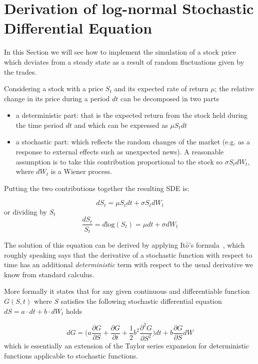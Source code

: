 \section{Derivation of log-normal Stochastic Differential Equation}
\label{derivation-of-log-normal-stochastic-differential-equation}

In this Section we will see how to implement the simulation of a stock price which deviates from a steady state as a result of random fluctuations given by the trades. 

Considering a stock with a price \(S_t\) and its expected rate of return \(\mu\); the relative change in its price during a period \(dt\) can be decomposed in two parts

\begin{itemize}
	\tightlist
	\item
	a deterministic part: that is the expected return from the stock held
	during the time period \(dt\) and which can be expressed as \(\mu S_tdt\)
	\item
	a stochastic part: which reflects the random changes of the market
	(e.g. as a response to external effects such as unexpected news). A
	reasonable assumption is to take this contribution proportional to the
	stock so \(\sigma S_t dW_t\), where \(dW_t\) is a Wiener process.
\end{itemize}
Putting the two contributions together the resulting SDE is:

\begin{equation}
dS_t = \mu S_t dt + \sigma S_t dW_t
\label{eq:differential}
\end{equation}
or dividing by $S_t$
\begin{equation}
\frac{dS_t}{S_t} = d\textrm{log}(S_t) = \mu dt + \sigma dW_t
\label{eq:differential_relative}
\end{equation}

The solution of this equation can be derived by applying It\(\hat{o}\)'s formula~\cite{bib:ito_lemma}, which roughly speaking says that the derivative of a stochastic function with respect to time has an additional \emph{deterministic} term with respect to the usual derivative we know from standard calculus. 

More formally it states that for any given continuous and differentiable function \(G(S, t)\) where \(S\) satisfies the following stochastic differential equation \(dS=a\cdot dt +b\cdot dW_t\) holds

\begin{equation}
dG = \big(a\frac{\partial G}{\partial S} + \frac{\partial G}{\partial t} + \frac{1}{2}b^2\frac{\partial^2 G}{\partial S^2} \big)dt + b \frac{\partial G}{\partial S}dW
\label{eq:itos_lemma}
\end{equation}
which is essentially an extension of the Taylor series expansion for deterministic functions applicable to stochastic functions.

